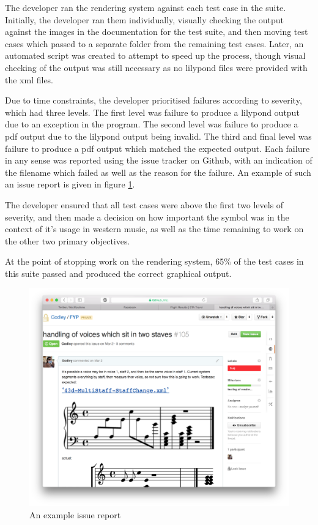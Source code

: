 The developer ran the rendering system against each test case in the suite. Initially, the developer ran them individually, visually checking the output against the images in the documentation for the test suite, and then moving test cases which passed to a separate folder from the remaining test cases. Later, an automated script was created to attempt to speed up the process, though visual checking of the output was still necessary as no lilypond files were provided with the xml files.


Due to time constraints, the developer prioritised failures according to severity, which had three levels. The first level was failure to produce a lilypond output due to an exception in the program. The second level was failure to produce a pdf output due to the lilypond output being invalid. The third and final level was failure to produce a pdf output which matched the expected output. Each failure in any sense was reported using the issue tracker on Github, with an indication of the filename which failed as well as the reason for the failure. An example of such an issue report is given in figure \ref{fig:issue}.

The developer ensured that all test cases were above the first two levels of severity, and then made a decision on how important the symbol was in the context of it's usage in western music, as well as the time remaining to work on the other two primary objectives.

At the point of stopping work on the rendering system, 65$\%$ of the test cases in this suite passed and produced the correct graphical output. 
\begin{figure}[H]
	\centering
	\includegraphics[width=400pt]{issue_report}	
	\caption{An example issue report}
	\label{fig:issue}
\end{figure}

